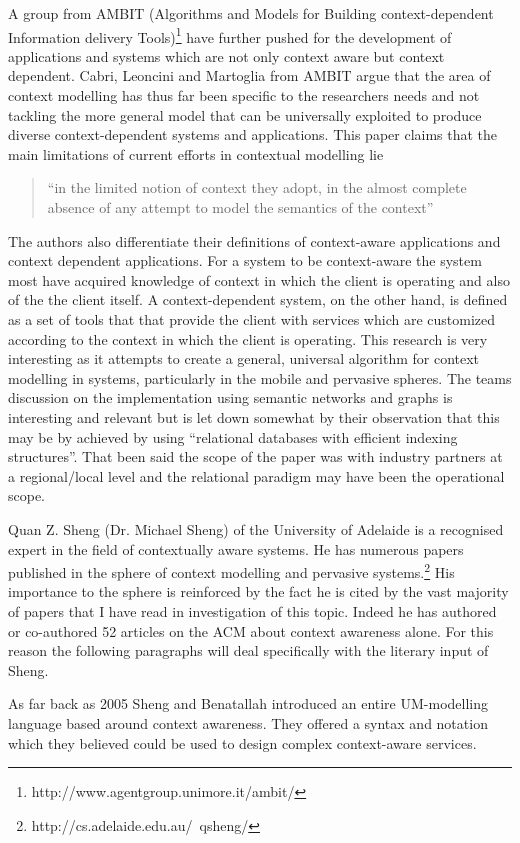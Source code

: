 \documentclass[]{report}
\begin{document}
%

A group from AMBIT (Algorithms and Models for Building context-dependent Information delivery Tools)\footnote{http://www.agentgroup.unimore.it/ambit/} have further pushed for the development of applications and systems which are not only context aware but context dependent. Cabri, Leoncini and Martoglia \cite{5} from AMBIT argue that the area of context modelling has thus far been specific to the researchers needs and not tackling the more general model that can be universally exploited to produce diverse context-dependent systems and applications. This paper claims that the main limitations of current efforts in contextual modelling lie  \begin{quote}
	``in the limited notion of context they adopt, in the almost complete absence of any attempt to model the semantics of the context''
\end{quote} The authors also differentiate their definitions of context-aware applications and context dependent applications. For a system to be context-aware the system most have acquired knowledge of context in which the client is operating and also of the the client itself. A context-dependent system, on the other hand, is defined as a set of tools that that provide the client with services which are customized  according to the context in which the client is operating. This research is very interesting as it attempts to create a general, universal algorithm for context modelling in systems, particularly in the mobile and pervasive spheres. The teams  discussion  on the implementation using semantic networks and graphs is interesting and relevant but is let down somewhat by their observation that this may be by achieved by using ``relational databases
with efficient indexing structures''. That been said the scope of the paper was with industry partners at a regional/local level and the relational paradigm may have been the operational scope.\par

%

Quan Z. Sheng (Dr. Michael Sheng) of the University of Adelaide is a recognised expert in the field of contextually aware systems. He has numerous papers published in the sphere of context modelling and pervasive systems.\footnote{http://cs.adelaide.edu.au/~qsheng/} His importance to the sphere is reinforced by the fact he is cited by the vast majority of papers that I have read in investigation of this topic. Indeed he has authored or co-authored 52 articles on the ACM about context awareness alone. For this reason the following paragraphs will deal specifically with the literary input of Sheng.\par
As far back as 2005 Sheng and Benatallah introduced an entire UM-modelling language based around context awareness\cite{6}. They offered a syntax and notation which they believed could be used to design complex context-aware services.\par
 
\end{document}

